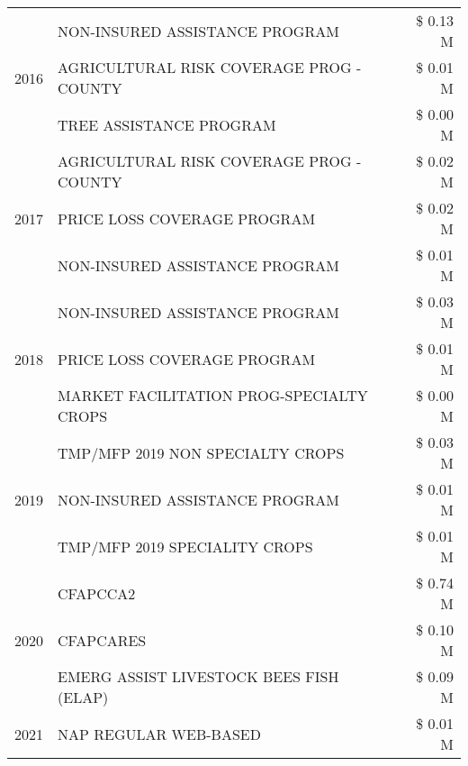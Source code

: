 \begin{tabular}{llr}
\cline{1-3}
\multirow[t]{3}{*}{2016} & NON-INSURED ASSISTANCE PROGRAM & \$ 0.13 M \\
 & AGRICULTURAL RISK COVERAGE PROG - COUNTY & \$ 0.01 M \\
 & TREE ASSISTANCE PROGRAM & \$ 0.00 M \\
\cline{1-3}
\multirow[t]{3}{*}{2017} & AGRICULTURAL RISK COVERAGE PROG - COUNTY & \$ 0.02 M \\
 & PRICE LOSS COVERAGE PROGRAM & \$ 0.02 M \\
 & NON-INSURED ASSISTANCE PROGRAM & \$ 0.01 M \\
\cline{1-3}
\multirow[t]{3}{*}{2018} & NON-INSURED ASSISTANCE PROGRAM & \$ 0.03 M \\
 & PRICE LOSS COVERAGE PROGRAM & \$ 0.01 M \\
 & MARKET FACILITATION PROG-SPECIALTY CROPS & \$ 0.00 M \\
\cline{1-3}
\multirow[t]{3}{*}{2019} & TMP/MFP 2019 NON SPECIALTY CROPS & \$ 0.03 M \\
 & NON-INSURED ASSISTANCE PROGRAM & \$ 0.01 M \\
 & TMP/MFP 2019 SPECIALITY CROPS & \$ 0.01 M \\
\cline{1-3}
\multirow[t]{3}{*}{2020} & CFAPCCA2 & \$ 0.74 M \\
 & CFAPCARES & \$ 0.10 M \\
 & EMERG ASSIST LIVESTOCK BEES FISH (ELAP) & \$ 0.09 M \\
\cline{1-3}
2021 & NAP REGULAR WEB-BASED & \$ 0.01 M \\
\cline{1-3}
\bottomrule
\end{tabular}
